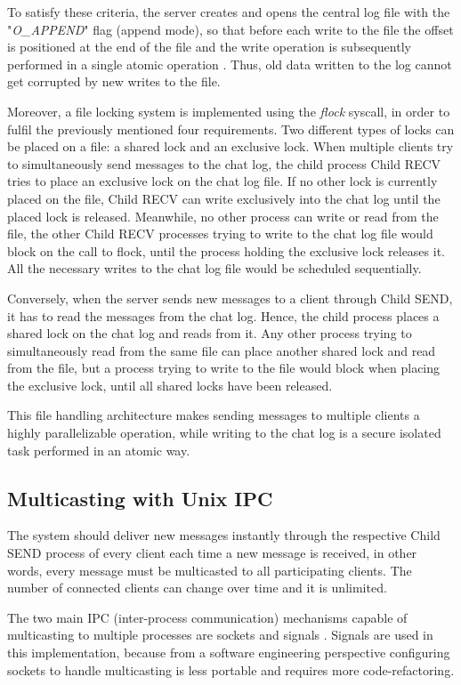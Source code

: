 To satisfy these criteria, the server creates and opens the central log file with the "\textit{O\_APPEND}" flag (append mode), so that before each write to the file the offset is positioned at the end of the file and the write operation is subsequently performed in a single atomic operation \cite{Kerrisk2010}. Thus, old data written to the log cannot get corrupted by new writes to the file.

Moreover, a file locking system is implemented using the \textit{flock} syscall, in order to fulfil the previously mentioned four requirements. Two different types of locks can be placed on a file: a shared lock and an exclusive lock. When multiple clients try to simultaneously send messages to the chat log, the child process Child RECV tries to place an exclusive lock on the chat log file.  If no other lock is currently placed on the file, Child RECV can write exclusively into the chat log until the placed lock is released. Meanwhile, no other process can write or read from the file, the other Child RECV processes trying to write to the chat log file would block on the call to flock, until the process holding the exclusive lock releases it. All the necessary writes to the chat log file would be scheduled sequentially.

Conversely, when the server sends new messages to a client through Child SEND, it has to read the messages from the chat log. Hence, the child process places a shared lock on the chat log and reads from it. Any other process trying to simultaneously read from the same file can place another shared lock and read from the file, but a process trying to write to the file would block when placing the exclusive lock, until all shared locks have been released. 

This file handling architecture makes sending messages to multiple clients a highly parallelizable operation, while writing to the chat log is a secure isolated task performed in an atomic way.

\subsection{Multicasting with Unix IPC}
The system should deliver new messages instantly through the respective Child SEND process of every client each time a new message is received, in other words, every message must be multicasted to all participating clients. The number of connected clients can change over time and it is unlimited. 

The two main IPC (inter-process communication) mechanisms capable of multicasting to multiple processes are sockets and signals \cite{Kerrisk2010}. Signals are used in this implementation, because from a software engineering perspective configuring sockets to handle multicasting is less portable and requires more code-refactoring.

